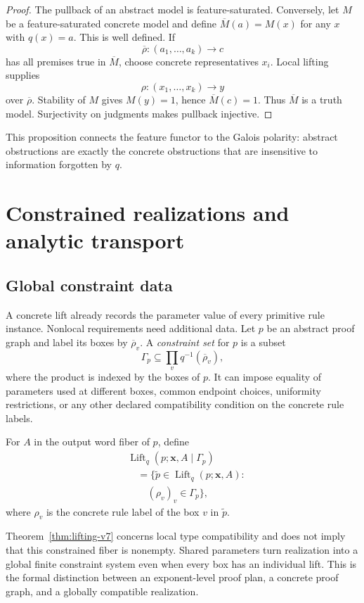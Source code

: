 \documentclass[10pt,journal,a4paper]{IEEEtran}
\theoremstyle{definition}
\begin{document}
\begin{proof}
The pullback of an abstract model is feature-saturated. Conversely, let $M$ be a feature-saturated concrete model and define $\overline M(a)=M(x)$ for any $x$ with $q(x)=a$. This is well defined. If
\[
  \overline\rho:(a_1,\ldots,a_k)\longrightarrow c
\]
has all premises true in $\overline M$, choose concrete representatives $x_i$. Local lifting supplies
\[
  \rho:(x_1,\ldots,x_k)\longrightarrow y
\]
over $\overline\rho$. Stability of $M$ gives $M(y)=1$, hence $\overline M(c)=1$. Thus $\overline M$ is a truth model. Surjectivity on judgments makes pullback injective.
\end{proof}

This proposition connects the feature functor to the Galois polarity: abstract obstructions are exactly the concrete obstructions that are insensitive to information forgotten by $q$.

\section{Constrained realizations and analytic transport}

\subsection{Global constraint data}

A concrete lift already records the parameter value of every primitive rule instance. Nonlocal requirements need additional data. Let $p$ be an abstract proof graph and label its boxes by $\overline\rho_v$. A \emph{constraint set} for $p$ is a subset
\[
  \Gamma_p
  \subseteq
  \prod_v q^{-1}(\overline\rho_v),
\]
where the product is indexed by the boxes of $p$. It can impose equality of parameters used at different boxes, common endpoint choices, uniformity restrictions, or any other declared compatibility condition on the concrete rule labels.

For $A$ in the output word fiber of $p$, define
\[
\begin{aligned}
  &\operatorname{Lift}_q(p;\mathbf x,A\mid\Gamma_p)\\
  &\quad=
  \bigl\{\widetilde p\in\operatorname{Lift}_q(p;\mathbf x,A):\\
  &\qquad (\rho_v)_v\in\Gamma_p\bigr\},
\end{aligned}
\]
where $\rho_v$ is the concrete rule label of the box $v$ in $\widetilde p$.

Theorem~\ref{thm:lifting-v7} concerns local type compatibility and does not imply that this constrained fiber is nonempty. Shared parameters turn realization into a global finite constraint system even when every box has an individual lift. This is the formal distinction between an exponent-level proof plan, a concrete proof graph, and a globally compatible realization.
\end{document}
